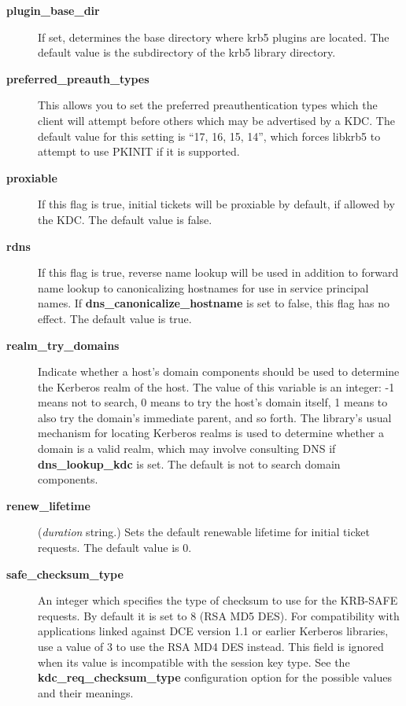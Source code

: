 \documentclass[letterpaper,10pt,english]{sphinxmanual}
\begin{document}
\begin{description}
\item[{\textbf{plugin\_base\_dir}}] \leavevmode
If set, determines the base directory where krb5 plugins are
located.  The default value is the  subdirectory
of the krb5 library directory.

\item[{\textbf{preferred\_preauth\_types}}] \leavevmode
This allows you to set the preferred preauthentication types which
the client will attempt before others which may be advertised by a
KDC.  The default value for this setting is ``17, 16, 15, 14'',
which forces libkrb5 to attempt to use PKINIT if it is supported.

\item[{\textbf{proxiable}}] \leavevmode
If this flag is true, initial tickets will be proxiable by
default, if allowed by the KDC.  The default value is false.

\item[{\textbf{rdns}}] \leavevmode
If this flag is true, reverse name lookup will be used in addition
to forward name lookup to canonicalizing hostnames for use in
service principal names.  If \textbf{dns\_canonicalize\_hostname} is set
to false, this flag has no effect.  The default value is true.

\item[{\textbf{realm\_try\_domains}}] \leavevmode
Indicate whether a host's domain components should be used to
determine the Kerberos realm of the host.  The value of this
variable is an integer: -1 means not to search, 0 means to try the
host's domain itself, 1 means to also try the domain's immediate
parent, and so forth.  The library's usual mechanism for locating
Kerberos realms is used to determine whether a domain is a valid
realm, which may involve consulting DNS if \textbf{dns\_lookup\_kdc} is
set.  The default is not to search domain components.

\item[{\textbf{renew\_lifetime}}] \leavevmode
(\emph{duration} string.)  Sets the default renewable lifetime
for initial ticket requests.  The default value is 0.

\item[{\textbf{safe\_checksum\_type}}] \leavevmode
An integer which specifies the type of checksum to use for the
KRB-SAFE requests.  By default it is set to 8 (RSA MD5 DES).  For
compatibility with applications linked against DCE version 1.1 or
earlier Kerberos libraries, use a value of 3 to use the RSA MD4
DES instead.  This field is ignored when its value is incompatible
with the session key type.  See the \textbf{kdc\_req\_checksum\_type}
configuration option for the possible values and their meanings.


\end{description}
\end{document}
